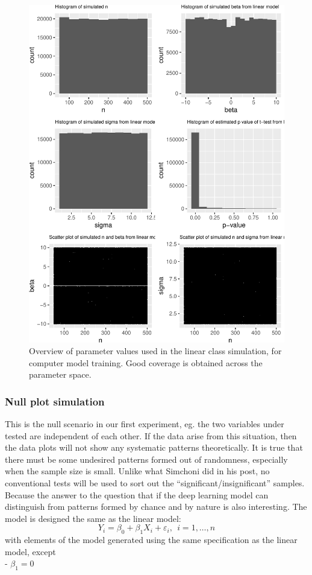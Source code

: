 \documentclass[12pt]{article}
\begin{document}
\begin{figure}
\centering
\includegraphics{pc_plots_files/figure-latex/simplot-1.pdf}
\caption{Overview of parameter values used in the linear class
simulation, for computer model training. Good coverage is obtained
across the parameter space.}
\end{figure}

\subsubsection{Null plot simulation}\label{null-plot-simulation}

This is the null scenario in our first experiment, eg. the two variables
under tested are independent of each other. If the data arise from this
situation, then the data plots will not show any systematic patterns
theoretically. It is true that there must be some undesired patterns
formed out of randomness, especially when the sample size is small.
Unlike what Simchoni did in his post, no conventional tests will be used
to sort out the ``significant/insignificant'' samples. Because the
answer to the question that if the deep learning model can distinguish
from patterns formed by chance and by nature is also interesting. The
model is designed the same as the linear model:
\[Y_i = \beta_0 + \beta_1 X_{i}  + \varepsilon_i, ~~i=1, \dots , n\]
with elements of the model generated using the same specification as the
linear model, except\\
- \(\beta_1 = 0\)
\end{document}
